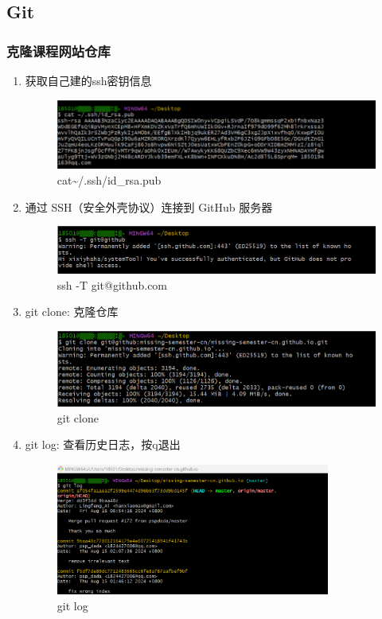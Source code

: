 \documentclass{ctexart}
\begin{document}
\subsection{Git}
\vspace{5pt}\subsubsection{克隆课程网站仓库}
\vspace{5pt}\begin{enumerate}
    \item 获取自己建的ssh密钥信息
\begin{figure}[H]
    \centering
    \includegraphics[width=19cm]{111.png}
    \caption{cat\quad\textasciitilde{}/.ssh/id\_rsa.pub}
    \label{fig:11}
\end{figure}
    \item 通过 SSH（安全外壳协议）连接到 GitHub 服务器
     \begin{figure}[H]
        \centering
        \includegraphics[width=19cm]{3.png}
        \caption{ssh -T git@github.com}
        \label{fig:12}
    \end{figure}
    \item git clone: 克隆仓库
    \begin{figure}[H]
       \centering
       \includegraphics[width=19cm]{4.png}
       \caption{git clone}
       \label{fig:13}
   \end{figure}

\vspace{-5pt}\item git log: 查看历史日志，按q退出
     \begin{figure}[H]
        \centering
        \includegraphics[width=9cm]{5.png}
        \caption{git log}
        \label{fig:14}
    \end{figure}


\end{enumerate}
\end{document}
